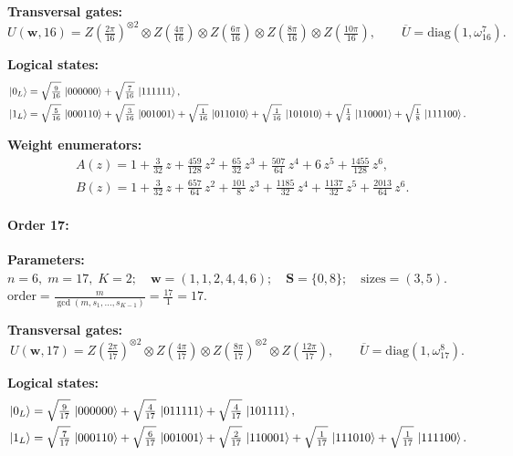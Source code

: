 \documentclass[pdflatex,sn-nature]{sn-jnl}%
\theoremstyle{thmstyleone}%
\theoremstyle{thmstyletwo}%
\theoremstyle{thmstylethree}%
\begin{document}
\begin{appendices}
\noindent\textbf{Transversal gates:}
\[
    U(\mathbf w,16)=Z \left(\tfrac{2\pi}{16}\right)^{\otimes2} \otimes Z \left(\tfrac{4\pi}{16}\right) \otimes Z \left(\tfrac{6\pi}{16}\right) \otimes Z \left(\tfrac{8\pi}{16}\right) \otimes Z \left(\tfrac{10\pi}{16}\right),\qquad
    \overline U=\mathrm{diag}(1,\omega_{16}^{7}).
\]

\noindent\textbf{Logical states:}
\begin{align*}
    &\ket{0_L} = \sqrt{\tfrac{9}{16}}\,\ket{000000} + \sqrt{\tfrac{7}{16}}\,\ket{111111}, \\
    &\ket{1_L} = \sqrt{\tfrac{5}{16}}\,\ket{000110} + \sqrt{\tfrac{3}{16}}\,\ket{001001} + \sqrt{\tfrac{1}{16}}\,\ket{011010} + \sqrt{\tfrac{1}{16}}\,\ket{101010} + \sqrt{\tfrac{1}{4}}\,\ket{110001} + \sqrt{\tfrac{1}{8}}\,\ket{111100}.
\end{align*}

\noindent\textbf{Weight enumerators:}
\begin{align*}
    &A(z) = 1 + \tfrac{3}{32}\,z + \tfrac{459}{128}\,z^{2} + \tfrac{65}{32}\,z^{3} + \tfrac{507}{64}\,z^{4} + 6\,z^{5} + \tfrac{1455}{128}\,z^{6}, \\
    &B(z) = 1 + \tfrac{3}{32}\,z + \tfrac{657}{64}\,z^{2} + \tfrac{101}{8}\,z^{3} + \tfrac{1185}{32}\,z^{4} + \tfrac{1137}{32}\,z^{5} + \tfrac{2013}{64}\,z^{6}.
\end{align*}

\paragraph{\textbf{Order 17:}}
\noindent\textbf{Parameters:} $n=6,\; m=17,\; K=2;\quad \mathbf w=(1, 1, 2, 4, 4, 6);\quad \mathbf S=\{0, 8\};\quad \text{sizes}=\left(3, 5\right).$ $\displaystyle \text{order}=\frac{m}{\gcd(m,s_1,\dots,s_{K-1})}=\frac{17}{1}=17.$

\noindent\textbf{Transversal gates:}
\[
    U(\mathbf w,17)=Z \left(\tfrac{2\pi}{17}\right)^{\otimes2} \otimes Z \left(\tfrac{4\pi}{17}\right) \otimes Z \left(\tfrac{8\pi}{17}\right)^{\otimes2} \otimes Z \left(\tfrac{12\pi}{17}\right),\qquad
    \overline U=\mathrm{diag}(1,\omega_{17}^{8}).
\]

\noindent\textbf{Logical states:}
\begin{align*}
    &\ket{0_L} = \sqrt{\tfrac{9}{17}}\,\ket{000000} + \sqrt{\tfrac{4}{17}}\,\ket{011111} + \sqrt{\tfrac{4}{17}}\,\ket{101111}, \\
    &\ket{1_L} = \sqrt{\tfrac{7}{17}}\,\ket{000110} + \sqrt{\tfrac{6}{17}}\,\ket{001001} + \sqrt{\tfrac{2}{17}}\,\ket{110001} + \sqrt{\tfrac{1}{17}}\,\ket{111010} + \sqrt{\tfrac{1}{17}}\,\ket{111100}.
\end{align*}


\end{appendices}
\end{document}
